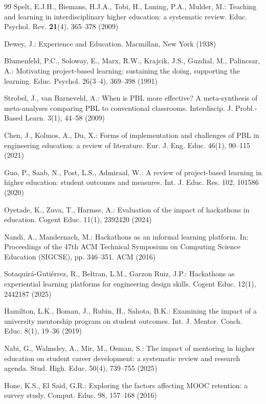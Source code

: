 \documentclass[runningheads]{llncs}
\begin{document}
\begin{thebibliography}{99}
Spelt, E.J.H., Biemans, H.J.A., Tobi, H., Luning, P.A., Mulder, M.: Teaching and learning in interdisciplinary higher education: a systematic review. Educ. Psychol. Rev. \textbf{21}(4), 365–378 (2009)

Dewey, J.: Experience and Education. Macmillan, New York (1938)

Blumenfeld, P.C., Soloway, E., Marx, R.W., Krajcik, J.S., Guzdial, M., Palincsar, A.: Motivating project-based learning: sustaining the doing, supporting the learning. Educ. Psychol. 26(3–4), 369–398 (1991)

Strobel, J., van Barneveld, A.: When is PBL more effective? A meta-synthesis of meta-analyses comparing PBL to conventional classrooms. Interdiscip. J. Probl.-Based Learn. 3(1), 44–58 (2009)

Chen, J., Kolmos, A., Du, X.: Forms of implementation and challenges of PBL in engineering education: a review of literature. Eur. J. Eng. Educ. 46(1), 90–115 (2021)

Guo, P., Saab, N., Post, L.S., Admiraal, W.: A review of project-based learning in higher education: student outcomes and measures. Int. J. Educ. Res. 102, 101586 (2020)

Oyetade, K., Zuva, T., Harmse, A.: Evaluation of the impact of hackathons in education. Cogent Educ. 11(1), 2392420 (2024)

Nandi, A., Mandernach, M.: Hackathons as an informal learning platform. In: Proceedings of the 47th ACM Technical Symposium on Computing Science Education (SIGCSE), pp. 346–351. ACM (2016)

Sotaquirá-Gutiérrez, R., Beltran, L.M., Garzon Ruiz, J.P.: Hackathons as experiential learning platforms for engineering design skills. Cogent Educ. 12(1), 2442187 (2025)

Hamilton, L.K., Boman, J., Rubin, H., Sahota, B.K.: Examining the impact of a university mentorship program on student outcomes. Int. J. Mentor. Coach. Educ. 8(1), 19–36 (2019)

Nabi, G., Walmsley, A., Mir, M., Osman, S.: The impact of mentoring in higher education on student career development: a systematic review and research agenda. Stud. High. Educ. 50(4), 739–755 (2025)

Hone, K.S., El Said, G.R.: Exploring the factors affecting MOOC retention: a survey study. Comput. Educ. 98, 157–168 (2016)


\end{thebibliography}
\end{document}
